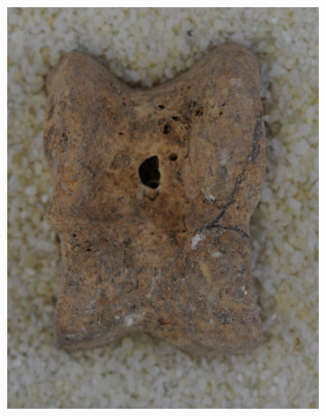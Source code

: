 \documentclass[pdftex,12pt,a4paper]{report}
\begin{document}
\begin{figure}[h]
\begin{subfigure}[b]{0.24\textwidth}
		\subcaption*{}
		\label{}
	\end{subfigure}
	\begin{subfigure}[b]{0.24\textwidth}
		\centering
		\includegraphics[width=.9\linewidth]{img/segmentation/bad/watershed/cut.jpg}
		\subcaption{}
		\label{fig:watershed-bad}
	\end{subfigure}
	\begin{subfigure}[b]{0.24\textwidth}
		\centering

\end{subfigure}
\end{figure}
\end{document}
